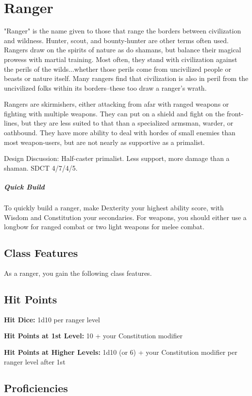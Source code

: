 \section{Ranger}\label{class:ranger}

"Ranger" is the name given to those that range the borders between civilization and wildness. Hunter, scout, and bounty-hunter are other terms often used. Rangers draw on the spirits of nature as do shamans, but balance their magical prowess with martial training. Most often, they stand with civilization against the perils of the wilds...whether those perils come from uncivilized people or beasts or nature itself. Many rangers find that civilization is also in peril from the uncivilized folks within its borders--these too draw a ranger's wrath.

Rangers are skirmishers, either attacking from afar with ranged weapons or fighting with multiple weapons. They can put on a shield and fight on the front-lines, but they are less suited to that than a specialized armsman, warder, or oathbound. They have more ability to deal with hordes of small enemies than most weapon-users, but are not nearly as supportive as a primalist.

Design Discussion: Half-caster primalist. Less support, more damage than a shaman. SDCT 4/7/4/5.

\subparagraph*{Quick Build}
To quickly build a ranger, make Dexterity your highest ability score, with Wisdom and Constitution your secondaries. For weapons, you should either use a longbow for ranged combat or two light weapons for melee combat. 

\subsection{Class Features}

As a ranger, you gain the following class features.

\subsection{Hit Points}

\textbf{Hit Dice:} 1d10 per ranger level

\textbf{Hit Points at 1st Level:} 10 + your Constitution modifier

\textbf{Hit Points at Higher Levels:} 1d10 (or 6) + your Constitution modifier per ranger level after 1st

\subsection{Proficiencies}

